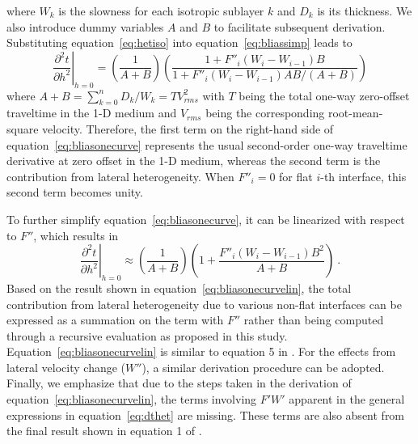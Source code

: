 where $W_k$ is the slowness for each isotropic sublayer $k$ and $D_k$ is its thickness. We also introduce dummy variables $A$ and $B$ to facilitate subsequent derivation.  Substituting equation~\ref{eq:hetiso} into equation~\ref{eq:bliassimp} leads to
\begin{equation}
\label{eq:bliasonecurve}
\left. \frac{\partial^2 t }{\partial h^2} \right\rvert_{h=0} = \left( \frac{1}{A +B} \right) \left( \frac{1+  F''_i (W_i - W_{i-1})B }{1+  F''_i (W_i - W_{i-1})AB /(A+B)} \right)
\end{equation}
where $ A+B = \sum^n_{k=0} D_k/W_k = T V^2_{rms}$ with $T$ being the total one-way zero-offset traveltime in the 1-D medium and $V_{rms}$ being the corresponding root-mean-square velocity. Therefore, the first term on the right-hand side of equation~\ref{eq:bliasonecurve} represents the usual second-order one-way traveltime derivative at zero offset in the 1-D medium, whereas the second term is the contribution from lateral heterogeneity. When $F''_i =0$ for flat $i$-th interface, this second term becomes unity.

To further simplify equation~\ref{eq:bliasonecurve}, it can be linearized with respect to $F''$, which results in
\begin{equation}
\label{eq:bliasonecurvelin}
\left. \frac{\partial^2 t }{\partial h^2} \right\rvert_{h=0} \approx \left( \frac{1}{A +B} \right) \left( 1+  \frac{F''_i (W_i - W_{i-1})B^2}{A+B} \right)~.
\end{equation}
Based on the result shown in equation~\ref{eq:bliasonecurvelin}, the total contribution from lateral heterogeneity due to various non-flat interfaces can be expressed as a summation  on the term with $F''$ rather than being computed through a recursive evaluation as proposed in this study. Equation~\ref{eq:bliasonecurvelin} is similar to equation 5 in \cite{blias2009stacking}. For the effects from lateral velocity change ($W''$), a similar derivation procedure can be adopted. Finally, we emphasize that due to the steps taken in the derivation of equation~\ref{eq:bliasonecurvelin}, the terms involving $F'W'$ apparent in the general expressions in equation~\ref{eq:dthet} are missing. These terms are also absent from the final result shown in equation 1 of \cite{blias2009stacking}.


